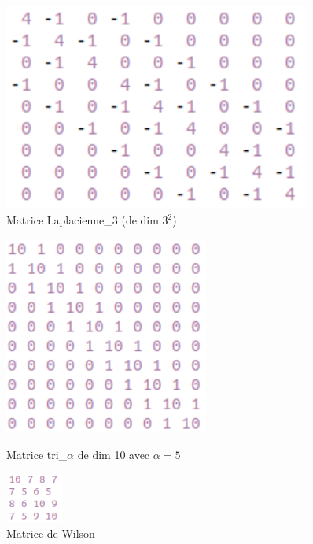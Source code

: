 \documentclass[12,french]{report}
\begin{document}
\begin{figure}[H]
    \begin{minipage}[c]{.46\linewidth}
        \centering
        \includegraphics[width=0.9\textwidth]{./Images/lap_3}\\
        \caption*{Matrice Laplacienne\_3 (de dim $3^{2}$)}
    \end{minipage}
    \hfill%
    \begin{minipage}[c]{.46\linewidth}
        \centering
        \includegraphics[width=0.6\textwidth]{./Images/tri_5_10}\\
        \caption*{Matrice tri\_$\alpha$ de dim 10 avec $\alpha=5$ }
    \end{minipage}
\end{figure}%

\begin{figure}[H]
	\centering
	\includegraphics[width=0.17\textwidth]{./Images/W}
	\caption*{Matrice de Wilson}
\end{figure}
\end{document}
